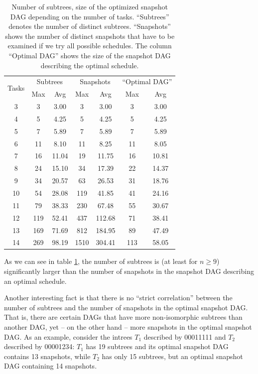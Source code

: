 \begin{table}[ht]
  \centering
  \begin{tabular}[ht]{ccccccc}
    \multirow{2}{*}{Tasks} & \multicolumn{2}{c}{Subtrees} & \multicolumn{2}{c}{Snapshots} & \multicolumn{2}{c}{``Optimal DAG''} \\
    & Max & Avg & Max & Avg & Max & Avg \\
    \hline
    3 & 3 & 3.00 & 3 & 3.00 & 3 & 3.00  \\
    4 & 5 & 4.25 & 5 & 4.25 & 5 & 4.25  \\
    5 & 7 & 5.89 & 7 & 5.89 & 7 & 5.89  \\
    6 & 11 & 8.10 & 11 & 8.25 & 11 & 8.05  \\
    7 & 16 & 11.04 & 19 & 11.75 & 16 & 10.81  \\
    8 & 24 &  15.10 & 34 & 17.39 & 22 & 14.37  \\
    9 & 34 &  20.57 & 63 & 26.53 & 31 & 18.76  \\
    10 & 54 &  28.08 & 119 & 41.85 & 41 & 24.16  \\
    11 & 79 &  38.33 & 230 & 67.48 & 55 & 30.67  \\
    12 & 119 & 52.41 & 437 & 112.68 & 71 & 38.41  \\
    13 & 169 &  71.69 & 812 & 184.95 & 89 & 47.49  \\
    14 & 269 &  98.19 & 1510 & 304.41 & 113 & 58.05  \\
  \end{tabular}
  \caption{Number of subtrees, size of the optimized snapshot DAG depending on the number of tasks. ``Subtrees'' denotes the number of distinct subtrees. ``Snapshots'' shows the number of distinct snapshots that have to be examined if we try all possible schedules. The column ``Optimal DAG'' shows the size of the snapshot DAG describing the optimal schedule.}
  \label{tab:num-subtrees-size-of-dags}
\end{table}

As we can see in table \ref{tab:num-subtrees-size-of-dags}, the number of subtrees is (at least for $n\geq  9$) significantly larger than the number of snapshots in the snapshot DAG describing an optimal schedule.

Another interesting fact is that there is no ``strict correlation'' between the number of subtrees and the number of snapshots in the optimal snapshot DAG. That is, there are certain DAGs that have more non-isomorphic subtrees than another DAG, yet -- on the other hand -- more snapshots in the optimal snapshot DAG. As an example, consider the intrees $T_1$ described by 00011111 and $T_2$ described by 00001234: $T_1$ has 19 subtrees and its optimal snapshot DAG contains 13 snapshots, while $T_2$ has only 15 subtrees, but an optimal snapshot DAG containing 14 snapshots.

